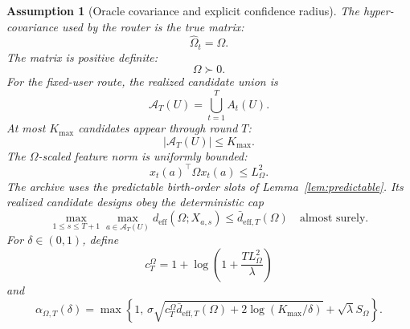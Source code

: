 \documentclass{article} %
\newtheorem{assumption}{Assumption}
\begin{document}
\begin{assumption}[Oracle covariance and explicit confidence radius]
\label{ass:hyper-oracle-calibrated}
The hyper-covariance used by the router is the true matrix:
\begin{equation}
\label{eq:hyper-oracle-omega-known}
\widehat{\Omega}_t=\Omega .
\end{equation}
The matrix is positive definite:
\begin{equation}
\label{eq:hyper-oracle-omega-pd}
\Omega \succ 0 .
\end{equation}
For the fixed-user route, the realized candidate union is
\begin{equation}
\label{eq:hyper-oracle-union}
\mathcal A_T(U)
=
\bigcup_{t=1}^{T}A_t(U).
\end{equation}
At most \(K_{\max}\) candidates appear through round \(T\):
\begin{equation}
\label{eq:hyper-oracle-kmax}
|\mathcal A_T(U)|\le K_{\max}.
\end{equation}
The \(\Omega\)-scaled feature norm is uniformly bounded:
\begin{equation}
\label{eq:hyper-oracle-feature-bound}
x_t(a)^\top\Omega x_t(a)\le L_{\Omega}^{2}.
\end{equation}
The archive uses the predictable birth-order slots of
Lemma~\ref{lem:predictable}. Its realized candidate designs obey the
deterministic cap
\begin{equation}
\label{eq:hyper-oracle-deff-cap}
\max_{1\le s\le T+1}\max_{a\in\mathcal A_T(U)}
d_{\mathrm{eff}}(\Omega;X_{a,s})
\le
\bar d_{\mathrm{eff},T}(\Omega)
\quad\text{almost surely}.
\end{equation}
For $\delta\in(0,1)$, define
\begin{equation}
\label{eq:hyper-oracle-cT}
c_T^\Omega
=
1+\log\!\left(1+\frac{TL_\Omega^2}{\lambda}\right)
\end{equation}
and
\begin{equation}
\label{eq:hyper-oracle-alpha}
\alpha_{\Omega,T}(\delta)
=
\max\!\left\{
1,\,
\sigma\sqrt{
c_T^\Omega\bar d_{\mathrm{eff},T}(\Omega)
+2\log(K_{\max}/\delta)}
+\sqrt{\lambda}S_\Omega
\right\}.
\end{equation}
\end{assumption}
\end{document}
